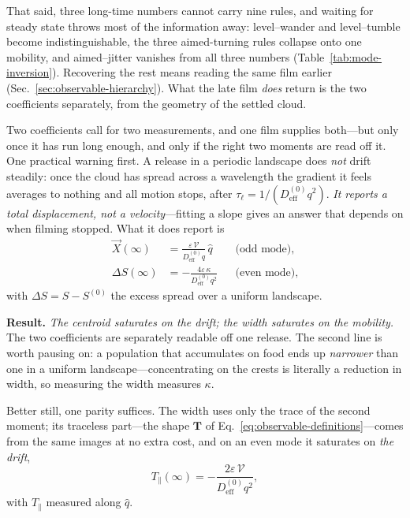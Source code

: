 \documentclass[
  reprint,
  superscriptaddress,
  amsmath,
  amssymb,
  aps,
  pre,
  nofootinbib,
  floatfix
]{revtex4-2}
\newcommand{\Xc}{\vec X}
\newcommand{\Tsh}{\mathbf T}
\begin{document}
That said, three long-time numbers cannot carry nine rules, and waiting for
steady state throws most of the information away: level--wander and
level--tumble become indistinguishable, the three aimed-turning rules collapse
onto one mobility, and aimed--jitter vanishes from all three numbers
(Table~\ref{tab:mode-inversion}).  Recovering the rest means reading the same
film earlier (Sec.~\ref{sec:observable-hierarchy}).  What the late film
\emph{does} return is the two coefficients separately, from the geometry of
the settled cloud.

\label{sec:observable-saturation}
Two coefficients call for two measurements, and one film supplies both---but
only once it has run long enough, and only if the right two moments are read
off it.  One practical warning first.  A release in a periodic landscape does
\emph{not} drift steadily: once the cloud has spread across a wavelength the
gradient it feels averages to nothing and all motion stops, after
$\tau_\ell=1/(D_{\mathrm{eff}}^{(0)}q^{2})$.  \emph{It reports a total
displacement, not a velocity}---fitting a slope gives an answer that depends
on when filming stopped.  What it does report is
\begin{equation}
\begin{aligned}
 \Xc(\infty)&=\frac{\varepsilon\,\mathcal V}{D_{\mathrm{eff}}^{(0)}q}\,\hat q
 &&\text{(odd mode)},\\[2pt]
 \Delta S(\infty)&=-\frac{4\varepsilon\,\kappa}{D_{\mathrm{eff}}^{(0)}q^{2}}
 &&\text{(even mode)},
\end{aligned}
 \label{eq:observable-saturation}
\end{equation}
with $\Delta S=S-S^{(0)}$ the excess spread over a uniform landscape.

\textbf{Result.}  \emph{The centroid saturates on the drift; the width
saturates on the mobility.}  The two coefficients are separately readable off
one release.  The second line is worth pausing on: a population that
accumulates on food ends up \emph{narrower} than one in a uniform
landscape---concentrating on the crests is literally a reduction in width, so
measuring the width measures $\kappa$.

Better still, one parity suffices.  The width uses only the trace of the
second moment; its traceless part---the shape $\Tsh$ of
Eq.~\eqref{eq:observable-definitions}---comes from the same images at no extra
cost, and on an even mode it saturates on \emph{the drift},
\begin{equation}
 T_{\parallel}(\infty)=-\frac{2\varepsilon\,\mathcal V}
 {D_{\mathrm{eff}}^{(0)}q^{2}},
 \label{eq:shape-saturation}
\end{equation}
with $T_\parallel$ measured along $\hat q$.
\end{document}
